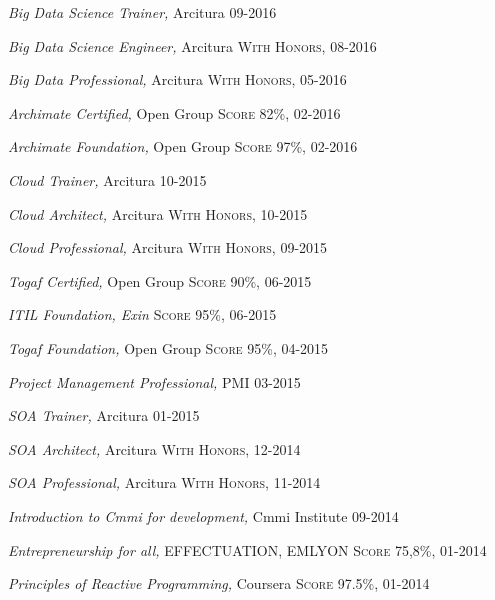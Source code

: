 \documentclass[10pt,a4paper]{article}
\begin{document}
\spacedhrule{-0.2em}{-0.4em}


\headedsection
  {{\sl \textit {Big Data Science Trainer},} Arcitura }
  {\textsc{09-2016}} 
  
\headedsection
  {{\sl \textit {Big Data Science Engineer},} Arcitura }
  {\textsc{With Honors, 08-2016}} 

\headedsection
  {{\sl \textit {Big Data Professional},} Arcitura }
  {\textsc{With Honors, 05-2016}} 

\headedsection
  {{\sl \textit {Archimate Certified},} Open Group}
  {\textsc{Score 82\%, 02-2016}}

\headedsection
  {{\sl \textit {Archimate Foundation},} Open Group}
  {\textsc{Score 97\%, 02-2016}}
  
\headedsection
  {{\sl \textit {Cloud Trainer},} Arcitura}
  {\textsc{ 10-2015}}  

\headedsection
  {{\sl \textit {Cloud Architect},} Arcitura }
  {\textsc{With Honors, 10-2015}} 

\headedsection
  {{\sl \textit {Cloud Professional},} Arcitura }
  {\textsc{With Honors, 09-2015}} 


\headedsection
  {{\sl \textit {Togaf Certified},} Open Group}
  {\textsc{Score 90\%, 06-2015}} 

\headedsection
  {\sl \textit{ITIL Foundation}, Exin}
  {\textsc{Score 95\%, 06-2015}}   
  
\headedsection
  {{\sl \textit {Togaf Foundation},} Open Group}
  {\textsc{Score 95\%, 04-2015}}     

\headedsection
  {{\sl \textit {Project Management Professional},} PMI}
  {\textsc{03-2015}} 

\headedsection
  {{\sl \textit {SOA Trainer},} Arcitura}
  {\textsc{01-2015}}  

\headedsection
  {{\sl \textit {SOA Architect},} Arcitura}
  {\textsc{With Honors, 12-2014}}  

\headedsection
  {{\sl \textit {SOA Professional},} Arcitura}
  {\textsc{With Honors, 11-2014}} 
 

\headedsection
  {{\sl \textit {Introduction to Cmmi for development},}  Cmmi Institute}
  {\textsc{ 09-2014}} 
  
\headedsection
  {{\sl \textit {Entrepreneurship for all},} EFFECTUATION, EMLYON}
  {\textsc{Score 75,8\%, 01-2014}} 

\headedsection
  {{\sl \textit {Principles of Reactive Programming},} Coursera}
  {\textsc{Score 97.5\%, 01-2014}} 
\end{document}
